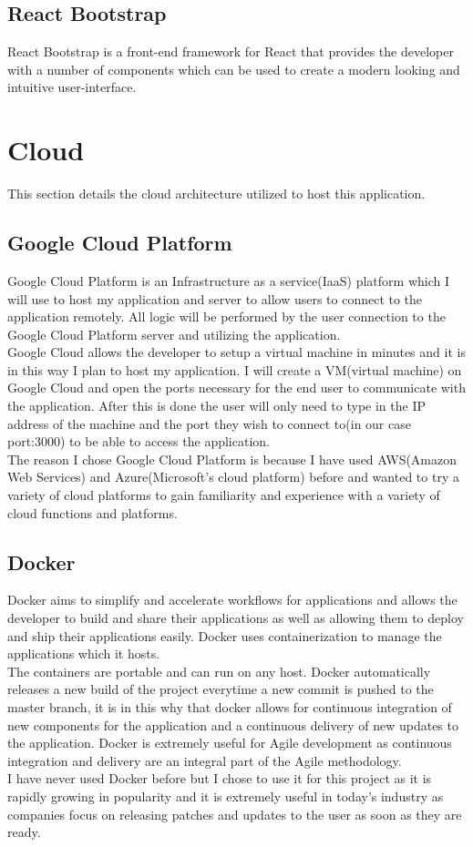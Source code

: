 \subsection{React Bootstrap}
React Bootstrap is a front-end framework for React that provides the developer with a number of components which can be used to create a modern looking and intuitive user-interface.
\section{Cloud}
This section details the cloud architecture utilized to host this application.
\subsection{Google Cloud Platform}
Google Cloud Platform is an Infrastructure as a service(IaaS) platform which I will use to host my application and server to allow users to connect to the application remotely\cite{GoogleCloudPlatform}.  All logic will be performed by the user connection to the Google Cloud Platform server and utilizing the application.
\\
Google Cloud allows the developer to setup a virtual machine in minutes and it is in this way I plan to host my application.  I will create a VM(virtual machine) on Google Cloud and open the ports necessary for the end user to communicate with the application.  After this is done the user will only need to type in the IP address of the machine and the port they wish to connect to(in our case port:3000) to be able to access the application.
\\
  The reason I chose Google Cloud Platform is because I have used AWS(Amazon Web Services) and Azure(Microsoft's cloud platform) before and wanted to try a variety of cloud platforms to gain familiarity and experience with a variety of cloud functions and platforms.
\subsection{Docker}
Docker aims to simplify and accelerate workflows for applications and allows the developer to build and share their applications as well as allowing them to deploy and ship their applications easily\cite{Docker}.  Docker uses containerization to manage the applications which it hosts.
\\
 The containers are portable and can run on any host.  Docker automatically releases a new build of the project everytime a new commit is pushed to the master branch, it is in this why that docker allows for continuous integration of new components for the application and a continuous delivery of new updates to the application.  Docker is extremely useful for Agile development as continuous integration and delivery are an integral part of the Agile methodology.
\\
  I have never used Docker before but I chose to use it for this project as it is rapidly growing in popularity and it is extremely useful in today's industry as companies focus on releasing patches and updates to the user as soon as they are ready.
